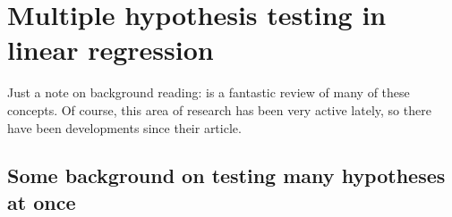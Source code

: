 

\chapter{Multiple hypothesis testing in linear regression}

Just a note on background reading: \citet{RSW08} is a fantastic review
of many of these concepts. Of course, this area of research has been
very active lately, so there have been developments since their
article.

  \section{Some background on testing many hypotheses at once}

